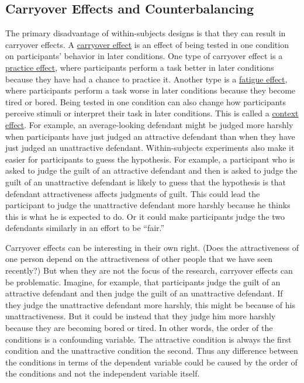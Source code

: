 \documentclass[
]{krantz}
\begin{document}
\hypertarget{carryover-effects-and-counterbalancing}{%
\subsection*{Carryover Effects and Counterbalancing}\label{carryover-effects-and-counterbalancing}}


The primary disadvantage of within-subjects designs is that they can result in carryover effects. A \protect\hyperlink{carryover-effect}{carryover effect} is an effect of being tested in one condition on participants' behavior in later conditions. One type of carryover effect is a \protect\hyperlink{practice-effect}{practice effect}, where participants perform a task better in later conditions because they have had a chance to practice it. Another type is a \protect\hyperlink{fatigue-effect}{fatigue effect}, where participants perform a task worse in later conditions because they become tired or bored. Being tested in one condition can also change how participants perceive stimuli or interpret their task in later conditions. This is called a \protect\hyperlink{context-effect-1}{context effect}. For example, an average-looking defendant might be judged more harshly when participants have just judged an attractive defendant than when they have just judged an unattractive defendant. Within-subjects experiments also make it easier for participants to guess the hypothesis. For example, a participant who is asked to judge the guilt of an attractive defendant and then is asked to judge the guilt of an unattractive defendant is likely to guess that the hypothesis is that defendant attractiveness affects judgments of guilt. This could lead the participant to judge the unattractive defendant more harshly because he thinks this is what he is expected to do. Or it could make participants judge the two defendants similarly in an effort to be ``fair.''

Carryover effects can be interesting in their own right. (Does the attractiveness of one person depend on the attractiveness of other people that we have seen recently?) But when they are not the focus of the research, carryover effects can be problematic. Imagine, for example, that participants judge the guilt of an attractive defendant and then judge the guilt of an unattractive defendant. If they judge the unattractive defendant more harshly, this might be because of his unattractiveness. But it could be instead that they judge him more harshly because they are becoming bored or tired. In other words, the order of the conditions is a confounding variable. The attractive condition is always the first condition and the unattractive condition the second. Thus any difference between the conditions in terms of the dependent variable could be caused by the order of the conditions and not the independent variable itself.
\end{document}
